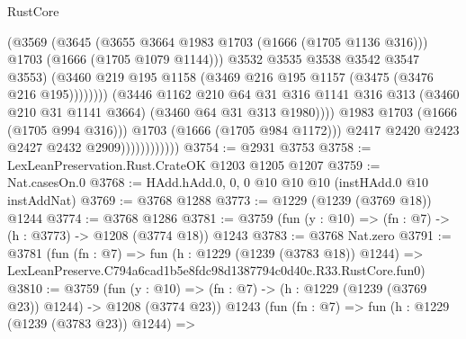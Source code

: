 \begin{lexlean}{RustCore}
\begin{coremodule}
                                            (@3569
                                              (@3645
                                                (@3655 @3664 @1983 @1703 (@1666 (@1705 @1136 @316)))
                                                @1703
                                                (@1666 (@1705 @1079 @1144)))
                                              @3532
                                              @3535
                                              @3538
                                              @3542
                                              @3547
                                              @3553)
                                            (@3460
                                              @219
                                              @195
                                              @1158
                                              (@3469 @216 @195 @1157 (@3475 (@3476 @216 @195))))))))
                                    (@3446
                                      @1162
                                      @210
                                      @64
                                      @31
                                      @316
                                      @1141
                                      @316
                                      @313
                                      (@3460 @210 @31 @1141 @3664)
                                      (@3460 @64 @31 @313 @1980))))
                                @1983
                                @1703
                                (@1666 (@1705 @994 @316)))
                              @1703
                              (@1666 (@1705 @984 @1172)))
                            @2417
                            @2420
                            @2423
                            @2427
                            @2432
                            @2909))))))))))))
@3754 := @2931 @3753
@3758 := LexLeanPreservation.Rust.CrateOK @1203 @1205 @1207
@3759 := Nat.casesOn.{0}
@3768 := HAdd.hAdd.{0, 0, 0} @10 @10 @10 (instHAdd.{0} @10 instAddNat)
@3769 := @3768 @1288
@3773 := @1229 (@1239 (@3769 @18)) @1244
@3774 := @3768 @1286
@3781 := @3759 (fun (y : @10) => (fn : @7) -> (h : @3773) -> @1208 (@3774 @18)) @1243
@3783 := @3768 Nat.zero
@3791 := @3781
    (fun (fn : @7) =>
    fun (h : @1229 (@1239 (@3783 @18)) @1244) =>
    LexLeanPreserve.C794a6cad1b5e8fdc98d1387794c0d40c.R33.RustCore.fun0)
@3810 := @3759
    (fun (y : @10) => (fn : @7) -> (h : @1229 (@1239 (@3769 @23)) @1244) -> @1208 (@3774 @23))
    @1243
    (fun (fn : @7) =>
    fun (h : @1229 (@1239 (@3783 @23)) @1244) =>

\end{coremodule}
\end{lexlean}
